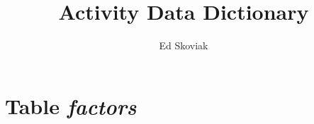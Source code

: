 \documentclass{article}
\author{Ed Skoviak}
\title{Activity Data Dictionary}
\begin{document}
\maketitle
\section{Table \textit{factors}}
\end{document}

